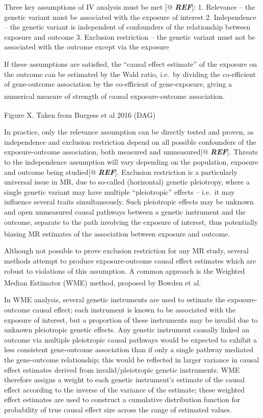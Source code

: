 \documentclass[
]{article}
\begin{document}
Three key assumptions of IV analysis must be met {[}@ \textbf{\emph{REF}}{]}:
1. Relevance -- the genetic variant must be associated with the exposure of interest
2. Independence -- the genetic variant is independent of confounders of the relationship between exposure and outcome
3. Exclusion restriction -- the genetic variant must not be associated with the outcome except via the exposure

If these assumptions are satisfied, the ``causal effect estimate'' of the exposure on the outcome can be estimated by the Wald ratio, i.e.~by dividing the co-efficient of gene-outcome association by the co-efficient of gene-exposure, giving a numerical measure of strength of causal exposure-outcome association\textsuperscript{}.

Figure X. Taken from Burgess et al 2016 (DAG)\textsuperscript{}

In practice, only the relevance assumption can be directly tested and proven, as independence and exclusion restriction depend on all possible confounders of the exposure-outcome association, both measured and unmeasured{[}@ \textbf{\emph{REF}}{]}. Threats to the independence assumption will vary depending on the population, exposure and outcome being studied{[}@ \textbf{\emph{REF}}{]}. Exclusion restriction is a particularly universal issue in MR, due to so-called (horizontal) genetic pleiotropy, where a single genetic variant may have multiple ``pleiotropic'' effects -- i.e.~it may influence several traits simultaneously. Such pleiotropic effects may be unknown and open unmeasured causal pathways between a genetic instrument and the outcome, separate to the path involving the exposure of interest, thus potentially biasing MR estimates of the association between exposure and outcome\textsuperscript{}.

Although not possible to prove exclusion restriction for any MR study, several methods attempt to produce exposure-outcome causal effect estimates which are robust to violations of this assumption. A common approach is the Weighted Median Estimator (WME) method, proposed by Bowden et al\textsuperscript{}.

In WME analysis, several genetic instruments are used to estimate the exposure-outcome causal effect; each instrument is known to be associated with the exposure of interest, but a proportion of these instruments may be invalid due to unknown pleiotropic genetic effects. Any genetic instrument causally linked an outcome via multiple pleiotropic causal pathways would be expected to exhibit a less consistent gene-outcome association than if only a single pathway mediated the gene-outcome relationship; this would be reflected in larger variance in causal effect estimates derived from invalid/pleiotropic genetic instruments. WME therefore assigns a weight to each genetic instrument's estimate of the causal effect according to the inverse of the variance of the estimate; these weighted effect estimates are used to construct a cumulative distribution function for probability of true causal effect size across the range of estimated values.
\end{document}
